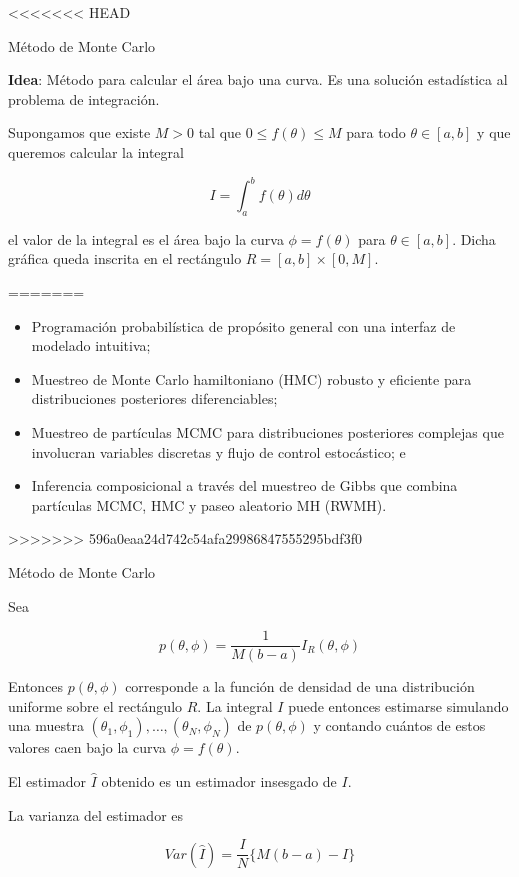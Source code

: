 \documentclass[11pt]{beamer}
\begin{document}
<<<<<<< HEAD
\begin{frame}{Método de Monte Carlo}\small

	\begin{center}
		\textbf{Idea}: Método para calcular el área bajo una curva. Es una solución estadística al problema de integración.
	\end{center}

Supongamos que existe $M > 0$ tal que $0 \leq f(\theta) \leq M$ para todo $ \theta \in [a,b]$ y que queremos calcular la integral 

	\begin{equation}
		I = \int_a^b f(\theta) d\theta
	\end{equation}

el valor de la integral es el área bajo la curva $ \phi = f(\theta)$ para $ \theta \in [a,b]$. Dicha gráfica queda inscrita en el rectángulo $R =  [a,b] \times [0,M]$.

=======
	\begin{itemize}
		\item Programación probabilística de propósito general con una interfaz de modelado intuitiva;
		\item Muestreo de Monte Carlo hamiltoniano (HMC) robusto y eficiente para distribuciones posteriores diferenciables;
		\item 
Muestreo de partículas MCMC para distribuciones posteriores complejas que involucran variables discretas y flujo de control estocástico; e
		\item 
Inferencia composicional a través del muestreo de Gibbs que combina partículas MCMC, HMC y paseo aleatorio MH (RWMH).
	\end{itemize}
>>>>>>> 596a0eaa24d742c54afa29986847555295bdf3f0
\end{frame}

\begin{frame}{Método de Monte Carlo}\small

Sea

	\begin{equation}
		p(\theta,\phi) =  \dfrac{1}{M(b-a)} I_R(\theta,\phi)
	\end{equation}
	
Entonces $p(\theta,\phi)$ corresponde a la función de densidad de una distribución uniforme sobre el rectángulo $R$. La integral $I$ puede entonces estimarse simulando una muestra $(\theta_1,\phi_1),\dots,(\theta_N,\phi_N)$ de $p(\theta,\phi)$ y contando cuántos de estos valores caen bajo la curva $ \phi = f(\theta)$.	

\vspace{0.5cm}
El estimador $\hat{I}$ obtenido es un estimador insesgado de $I$.

\vspace{0.5cm}
La varianza del estimador es 

\[Var(\hat{I}) = \dfrac{I}{N} \lbrace M(b-a) -I \rbrace\]
\end{frame}
\end{document}
